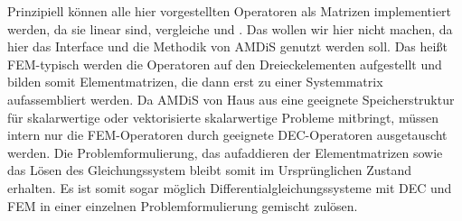   \begin{bemerkung}
    Prinzipiell können alle hier vorgestellten Operatoren als Matrizen implementiert werden, da sie linear sind, vergleiche \cite{siggraphKap7} und \cite{siggraphKap8}.
    Das wollen wir hier nicht machen, da hier das Interface und die Methodik von AMDiS genutzt werden soll.
    Das heißt FEM-typisch werden die Operatoren auf den Dreieckelementen aufgestellt und bilden somit Elementmatrizen, die dann erst zu einer Systemmatrix aufassembliert werden.
    Da AMDiS von Haus aus eine geeignete Speicherstruktur für skalarwertige oder vektorisierte skalarwertige Probleme mitbringt, müssen intern nur die FEM-Operatoren durch geeignete
    DEC-Operatoren ausgetauscht werden.
    Die Problemformulierung, das aufaddieren der Elementmatrizen sowie das Lösen des Gleichungssystem bleibt somit im Ursprünglichen Zustand erhalten.
    Es ist somit sogar möglich Differentialgleichungssysteme mit DEC und FEM in einer einzelnen Problemformulierung gemischt zulösen.
  \end{bemerkung}

